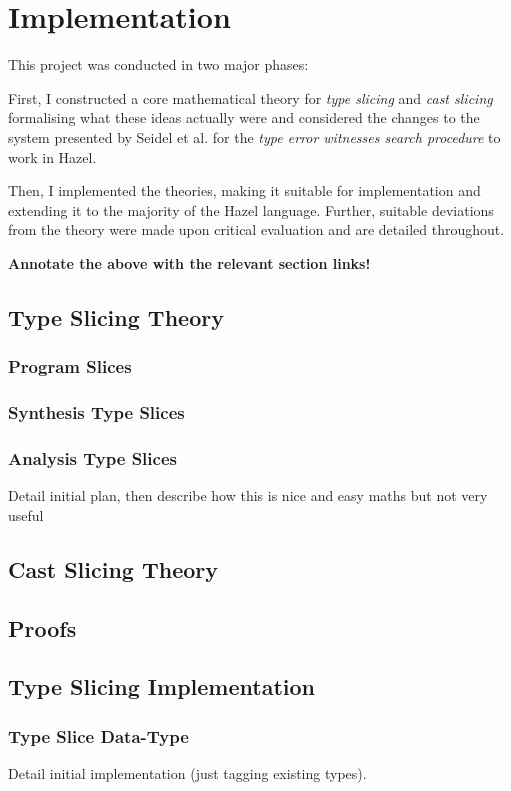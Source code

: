 \chapter{Implementation}
This project was conducted in two major phases:

First, I constructed a core mathematical theory for \textit{type slicing} and \textit{cast slicing} formalising what these ideas actually were and considered the changes to the system presented by Seidel et al. for the \textit{type error witnesses search procedure} to work in Hazel.  

Then, I implemented the theories, making it suitable for implementation and extending it to the majority of the Hazel language. Further, suitable deviations from the theory were made upon critical evaluation and are detailed throughout.

\textbf{Annotate the above with the relevant section links!}
\section{Type Slicing Theory}
\subsection{Program Slices}
\subsection{Synthesis Type Slices}
\subsection{Analysis Type Slices}
Detail initial plan, then describe how this is nice and easy maths but not very useful

\section{Cast Slicing Theory}

\section{Proofs}

\section{Type Slicing Implementation}
\subsection{Type Slice Data-Type}
Detail initial implementation (just tagging existing types).
